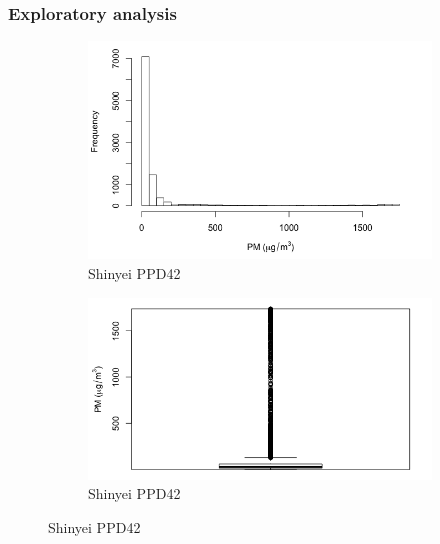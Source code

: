 \documentclass[11pt,twosided,a4paper]{report}
\begin{document}
\subsubsection{Exploratory analysis}

\begin{figure}[!tbp]
    \begin{minipage}{1\linewidth}
        \centering
            \begin{subfigure}[t]{.4\linewidth}
                \includegraphics[width=\textwidth]{images/pm_histogram}
                \caption{Shinyei PPD42}
                \label{fig:pm_histogram}
            \end{subfigure}
            \hfill
            \begin{subfigure}[t]{.4\linewidth}
            	\includegraphics[width=\textwidth]{images/pm_boxplot}
            	\caption{Shinyei PPD42}
            	\label{fig:pm_boxplot}
	   \end{subfigure}
        \end{minipage}
    \begin{minipage}{1\linewidth}

\end{minipage}
\end{figure}
\end{document}
